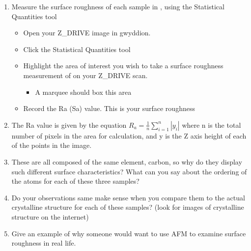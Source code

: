 \documentclass{../lab}
\begin{document}
{\begin{enumerate}
\begin{itemize}
        \item Be sure you know which data belongs with which sample.  \textbf{The data file cannot be opened if renamed improperly. Have some method of keeping track of your data.}

    \end{itemize}

    \item Measure the surface roughness of each sample in \textbf{}, using the Statistical Quantities tool
    \begin{itemize}
        \item Open your Z\_DRIVE image in gwyddion.

        \item Click the Statistical Quantities tool

        \item Highlight the area of interest you wish to take a surface roughness measurement of on your Z\_DRIVE scan.

    \begin{itemize}
        \item A marquee should box this area

    \end{itemize}

        \item Record the Ra (Sa) value. This is your surface roughness

    \end{itemize}

    \item The Ra value is given by the equation $R_a=\frac{1}{n} \sum\limits_{i=1}^{n} |y_i|$ where n is the total number of pixels in the area for calculation, and y is the Z axis height of each of the points in the image.

    \item These are all composed of the same element, carbon, so why do they display such different surface characteristics? What can you say about the ordering of the atoms for each of these three samples?

    \item Do your observations same make sense when you compare them to the actual crystalline structure for each of these samples? (look for images of crystalline structure on the internet)

    \item Give an example of why someone would want to use AFM to examine surface roughness in real life.


\end{enumerate}}
\end{document}
